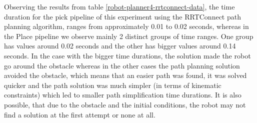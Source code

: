Observing the results from table \ref{robot-planner4-rrtconnect-data}, the time duration for the pick pipeline of this experiment using the RRTConnect path planning algorithm, 
ranges from approximately 0.01 to 0.02 seconds, whereas in the Place pipeline we observe mainly 2 distinct groups of time ranges. One group has values around 0.02 seconds and the other 
has bigger values around 0.14 seconds. In the case with the bigger time durations, the solution made the robot go around the obstacle whereas in the other cases the path planning solution avoided the obstacle, 
which means that an easier path was found, it was solved quicker and the path solution was much simpler (in terms of kinematic constraints) which led to smaller path simplification time durations. 
It is also possible, that due to the obstacle and the initial conditions, the robot may not find a solution at the first attempt or none at all.

\begin{table}[H]
\centering
{}
\caption{Time results for robot planner 4 using the RRTConnect path planner algorithm}
\label{robot-planner4-rrtconnect-data}
\end{table}

